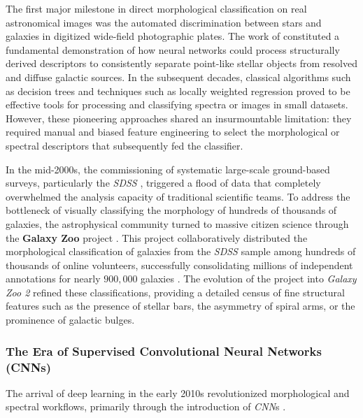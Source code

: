 The first major milestone in direct morphological classification on real astronomical images was the automated discrimination between stars and galaxies in digitized wide-field photographic plates. The work of \textcite{ar:odewahn-1992} constituted a fundamental demonstration of how neural networks could process structurally derived descriptors to consistently separate point-like stellar objects from resolved and diffuse galactic sources. In the subsequent decades, classical algorithms such as decision trees \autocites{ar:owens-1996}{ar:bazell-2001} and techniques such as locally weighted regression \autocite{ar:calleja-2004} proved to be effective tools for processing and classifying spectra or images in small datasets. However, these pioneering approaches shared an insurmountable limitation: they required manual and biased feature engineering to select the morphological or spectral descriptors that subsequently fed the classifier.

In the mid-2000s, the commissioning of systematic large-scale ground-based surveys, particularly the \textit{\gls{SDSS}} \autocite{ar:york-2000}, triggered a flood of data that completely overwhelmed the analysis capacity of traditional scientific teams. To address the bottleneck of visually classifying the morphology of hundreds of thousands of galaxies, the astrophysical community turned to massive citizen science through the \textbf{Galaxy Zoo} project \autocite{ar:lintott-2008}. This project collaboratively distributed the morphological classification of galaxies from the \textit{\gls{SDSS}} sample among hundreds of thousands of online volunteers, successfully consolidating millions of independent annotations for nearly $900,000$ galaxies \autocite{ar:lintott-2011}. The evolution of the project into \textit{Galaxy Zoo 2} \autocite{ar:willett-2013} refined these classifications, providing a detailed census of fine structural features such as the presence of stellar bars, the asymmetry of spiral arms, or the prominence of galactic bulges.


\subsubsection{The Era of Supervised Convolutional Neural Networks (CNNs)}

The arrival of deep learning in the early 2010s revolutionized morphological and spectral workflows, primarily through the introduction of \textit{\gls{CNN}}s \autocites{ar:huertas-company-2015}{ar:dieleman-2015}{ar:dominguez-sanchez-2018}.

